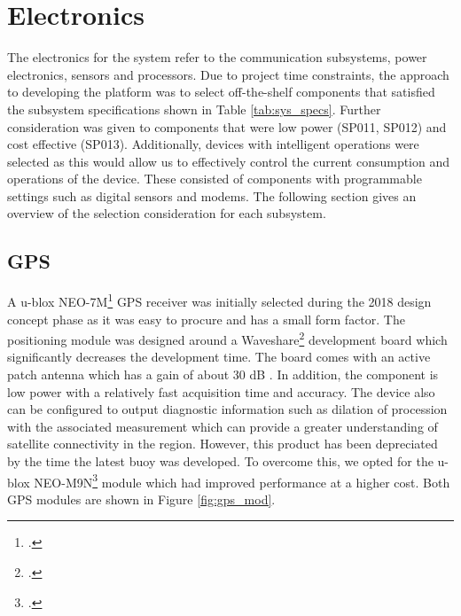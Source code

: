 \section{Electronics}

The electronics for the system refer to the communication subsystems, power electronics, sensors and processors. Due to project time constraints, the approach to developing the platform was to select off-the-shelf components that satisfied the subsystem specifications shown in Table \ref{tab:sys_specs}. Further consideration was given to components that were low power (SP011, SP012) and cost effective (SP013). Additionally, devices with intelligent operations were selected as this would allow us to effectively control the current consumption and operations of the device. These consisted of components with programmable settings such as digital sensors and modems. The following section gives an overview of the selection consideration for each subsystem.

\subsection{GPS}
\label{subsec:ch3_gps}
A u-blox NEO-7M\footcite{UBLOX_M7N_DATA} GPS receiver was initially selected during the 2018 design concept phase as it was easy to procure and has a small form factor. The positioning  module was designed around a Waveshare\footcite{waveshare} development board which significantly decreases the development time. The board comes with an active patch antenna which has a gain of about 30 dB \cite{waveshare}. In addition, the component is low power with a relatively fast acquisition time and accuracy. The device also can be configured to output diagnostic information such as dilation of procession with the associated measurement which can provide a greater understanding of satellite connectivity in the region. However,  this product has been depreciated by the time the latest buoy was developed. To overcome this, we opted for the u-blox NEO-M9N\footcite{UBLOX_M9N_DATA} module which had improved performance at a higher cost. Both GPS modules are shown in Figure \ref{fig:gps_mod}.


